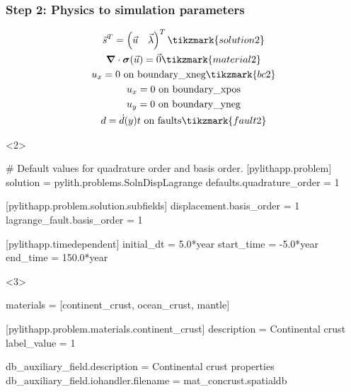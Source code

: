 \documentclass[aspectratio=169]{beamer}
\begin{document}
\begin{frame}[t,fragile]
  \frametitle{Step 2: Physics to simulation parameters}
  \summary{}

  \vspace*{-2\baselineskip}
  \begin{minipage}[t]{0.3\textwidth}
    {\scriptsize
    \begin{gather*}
    \vec{s}^T = \left( \vec{u} \quad \vec{\lambda} \right)^T \tikzmark{solution2}\\
    \tensor{\nabla} \cdot \tensor{\sigma}(\vec{u}) = \vec{0} \tikzmark{material2}\\
    u_x = 0 \text{ on boundary\_xneg} \tikzmark{bc2}\\
    u_x = 0 \text{ on boundary\_xpos} \\
    u_y = 0 \text{ on boundary\_yneg} \\
    d = \dot{d}(y) t \text{ on faults} \tikzmark{fault2}
    \end{gather*}}
  \end{minipage}
  \hfill
  \begin{minipage}[t]{0.67\textwidth}
    \begin{onlyenv}<2>
      \begin{cfgcode}
        # Default values for quadrature order and basis order.
        [pylithapp.problem]
        solution = pylith.problems.SolnDispLagrange
        defaults.quadrature_order = 1
        
        [pylithapp.problem.solution.subfields]
        displacement.basis_order = 1
        lagrange_fault.basis_order = 1

        [pylithapp.timedependent]
        initial_dt = 5.0*year
        start_time = -5.0*year
        end_time = 150.0*year
      \end{cfgcode}
    \end{onlyenv}
    \begin{onlyenv}<3>
      \begin{cfgcode}
        materials = [continent_crust, ocean_crust, mantle]

        [pylithapp.problem.materials.continent_crust]
        description = Continental crust
        label_value = 1

        db_auxiliary_field.description = Continental crust properties
        db_auxiliary_field.iohandler.filename = mat_concrust.spatialdb


\end{cfgcode}
\end{onlyenv}
\end{minipage}
\end{frame}
\end{document}
